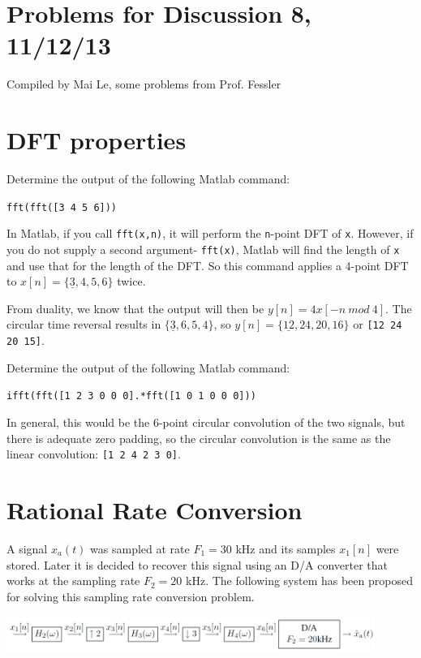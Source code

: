 \documentclass[11pt]{article}
\begin{document}
{\small
\section*{Problems for Discussion 8, 11/12/13}
Compiled by Mai Le, some problems from Prof. Fessler
}

\section{DFT properties}
Determine the output of the following Matlab command: 

\texttt{fft(fft([3 4 5 6]))}

{\color{blue}
In Matlab, if you call \texttt{fft(x,n)}, it will perform the \texttt{n}-point DFT of \texttt{x}. However, if you do not supply a second argument- \texttt{fft(x)}, Matlab will find the length of \texttt{x} and use that for the length of the DFT. So this command applies a 4-point DFT to $x[n] = \{\underline{3}, 4, 5, 6\}$ twice.

From duality, we know that the output will then be $y[n] = 4x[-n\ mod\ 4]$. The circular time reversal results in $\{\underline{3}, 6, 5, 4\}$, so $y[n] = \{\underline{12}, 24, 20, 16\}$ or \texttt{[12 24 20 15]}.
}

Determine the output of the following Matlab command:

\texttt{ifft(fft([1 2 3 0 0 0].*fft([1 0 1 0 0 0]))}

{\color{blue}
In general, this would be the 6-point circular convolution of the two signals, but there is adequate zero padding, so the circular convolution is the same as the linear convolution: \texttt{[1 2 4 2 3 0]}.
}

\section{Rational Rate Conversion}
A signal $x_a(t)$ was sampled at rate $F_1 = 30$ kHz and its samples $x_1[n]$ were stored. Later it is decided to recover this signal using an D/A converter that works at the sampling rate $F_2 = 20$ kHz. The following system has been proposed for solving this sampling rate conversion problem.

\includegraphics[width = 0.9\textwidth]{rate_conv_a.png} 
\end{document}

